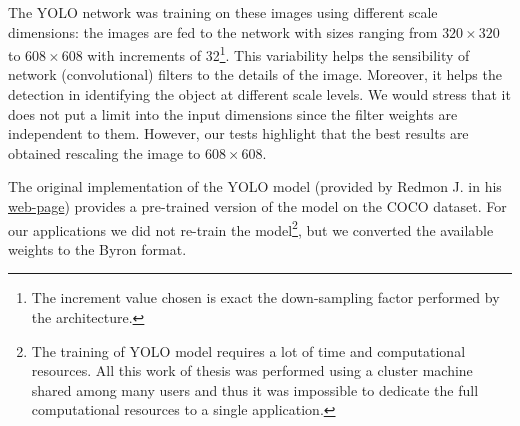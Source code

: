 \documentclass{standalone}
\begin{document}
The YOLO network was training on these images using different scale dimensions: the images are fed to the network with sizes ranging from $320\times320$ to $608\times608$ with increments of 32\footnote{
  The increment value chosen is exact the down-sampling factor performed by the architecture.
}.
This variability helps the sensibility of network (convolutional) filters to the details of the image.
Moreover, it helps the detection in identifying the object at different scale levels.
We would stress that it does not put a limit into the input dimensions since the filter weights are independent to them.
However, our tests highlight that the best results are obtained rescaling the image to $608\times608$.

The original implementation of the YOLO model (provided by Redmon J. in his \href{https://pjreddie.com/darknet/yolo}{web-page}) provides a pre-trained version of the model on the COCO dataset.
For our applications we did not re-train the model\footnote{
  The training of YOLO model requires a lot of time and computational resources.
  All this work of thesis was performed using a cluster machine shared among many users and thus it was impossible to dedicate the full computational resources to a single application.
}, but we converted the available weights to the \textsf{Byron} format.
\end{document}

